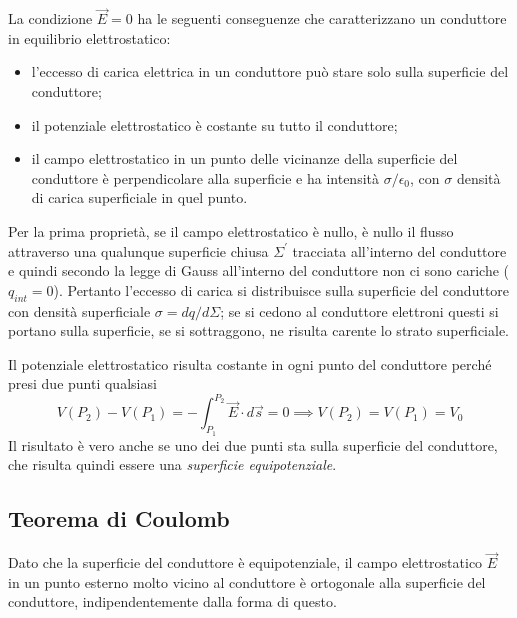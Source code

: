 \documentclass[class=book, crop=false, oneside, 12pt]{standalone}
\begin{document}
La condizione \(\overrightarrow{E} = 0\) ha le seguenti conseguenze che caratterizzano un conduttore in equilibrio elettrostatico: 
\begin{itemize}
    \item l'eccesso di carica elettrica in un conduttore può stare solo sulla superficie del conduttore;
    \item il potenziale elettrostatico è costante su tutto il conduttore;
    \item il campo elettrostatico in un punto delle vicinanze della superficie del conduttore è perpendicolare alla superficie e ha intensità \(\sigma/ \epsilon_0\), con \(\sigma\) densità di carica superficiale in quel punto.
\end{itemize}
Per la prima proprietà, se il campo elettrostatico è nullo, è nullo il flusso attraverso una qualunque superficie chiusa \(\Sigma^{\prime}\) tracciata all'interno del conduttore e quindi secondo la legge di Gauss all'interno del conduttore non ci sono cariche ( \(q_{int} = 0\)).
Pertanto l'eccesso di carica si distribuisce sulla superficie del conduttore con densità superficiale \(\sigma = dq/ d \Sigma\); se si cedono al conduttore elettroni questi si portano sulla superficie, se si sottraggono, ne risulta carente lo strato superficiale. 

Il potenziale elettrostatico risulta costante in ogni punto del conduttore perché presi due punti qualsiasi
\begin{equation*}
    V(P_2) - V(P_1) = - \int_{P_1}^{P_2} \overrightarrow{E} \cdot d \overrightarrow{s} = 0 \implies V(P_2) = V(P_1) = V_0
\end{equation*}
Il risultato è vero anche se uno dei due punti sta sulla superficie del conduttore, che risulta quindi essere una \emph{superficie equipotenziale}. 

\subsection{Teorema di Coulomb}

Dato che la superficie del conduttore è equipotenziale, il campo elettrostatico \(\overrightarrow{E}\) in un punto esterno molto vicino al conduttore è ortogonale alla superficie del conduttore, indipendentemente dalla forma di questo.
\end{document}
